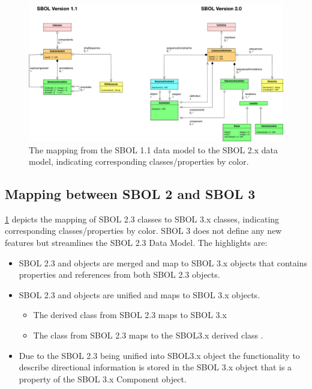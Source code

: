 \begin{figure}[h]
\begin{center}
  \includegraphics[width=\textwidth]{images/sbol_v1_to_v2}
\end{center}
\caption{\label{SBOL1TO2}The mapping from the SBOL 1.1 data model to the SBOL 2.x  data model, indicating corresponding classes/properties by color.}
\end{figure}

\subsection{Mapping between SBOL 2 and SBOL 3}

\ref{SBOL1TO2} depicts the mapping of SBOL 2.3 classes to SBOL 3.x classes, indicating corresponding classes/properties by color.
SBOL 3 does not define any new features but streamlines the SBOL 2.3 Data Model.
The highlights are:
\begin{itemize}
	
	\item SBOL 2.3  and  objects are merged and map to SBOL 3.x  objects that contains properties and references from both SBOL 2.3 objects.
	
	\item SBOL 2.3  and  objects are unified and maps to SBOL 3.x  objects.
	
	\begin{itemize}
		
		\item The derived class from SBOL 2.3  maps to SBOL 3.x 
		\item The class from SBOL 2.3  maps to the SBOL3.x derived class .
	\end{itemize}
	
	\item Due to the SBOL 2.3  being unified into SBOL3.x  object the functionality to describe directional information is stored in the SBOL 3.x  object that is a property of the SBOL 3.x {Component} object.
	
\end{itemize}

